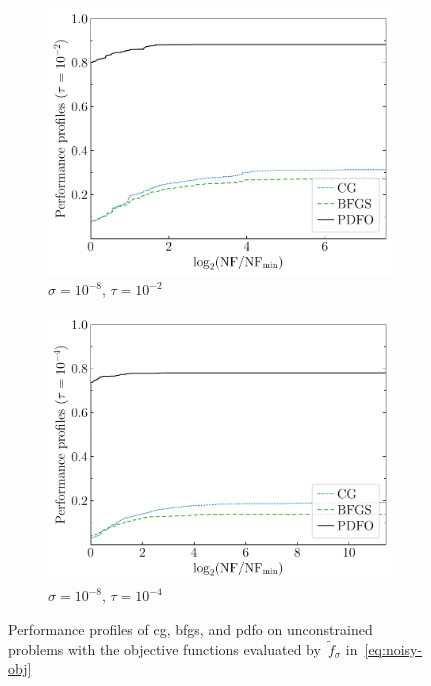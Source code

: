 \documentclass[
    smallextended,  %
    draft,          %
    final,          %
]{svjour3}
\newcommand{\obj}{f}
\begin{document}
\begin{figure}[htbp]
\begin{subfigure}{.48\textwidth}
        \includegraphics[width=\textwidth]{perf-noisy-bfgs_cg_pdfo-50-8-2.pdf}
        \caption{$\sigma = 10^{-8}$, $\tau = 10^{-2}$}
    \end{subfigure}
    \hfill
    \begin{subfigure}{.48\textwidth}
        \centering
        \includegraphics[width=\textwidth]{perf-noisy-bfgs_cg_pdfo-50-8-4.pdf}
        \caption{$\sigma = 10^{-8}$, $\tau = 10^{-4}$}
    \end{subfigure}
    \caption{Performance profiles of \gls{cg}, \gls{bfgs}, and \gls{pdfo} on unconstrained problems
    with the objective functions evaluated by~$\tilde{\obj}_\sigma$ in~\eqref{eq:noisy-obj}}
    \label{fig:noise}
\end{figure}
\end{document}
